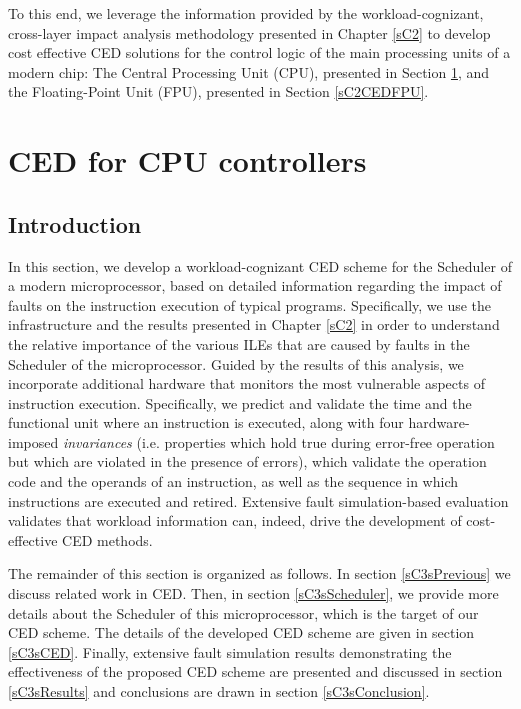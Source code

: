 \documentclass[12pt]{yalephd}
\begin{document}
To this end, we leverage the information provided by the workload-cognizant, cross-layer impact analysis methodology presented in Chapter \ref{sC2} to develop cost effective CED solutions for the control logic of the main processing units of a modern chip: The Central Processing Unit (CPU), presented in Section \ref{sC2CEDCPU}, and the Floating-Point Unit (FPU), presented in Section \ref{sC2CEDFPU}.

\section{CED for CPU controllers}\label{sC2CEDCPU}

\subsection{Introduction}

In this section, we develop a workload-cognizant CED scheme for the Scheduler of a modern microprocessor, based on detailed information regarding the impact of faults on the instruction execution of typical programs. Specifically, we use the infrastructure and the results presented in Chapter \ref{sC2} in order to understand the relative importance of the various ILEs that are caused by faults in the Scheduler of the microprocessor. Guided by the results of this analysis, we incorporate additional hardware that monitors the most vulnerable aspects of instruction execution. Specifically, we predict and validate the time and the functional unit where an instruction is executed, along with four hardware-imposed {\em invariances} (i.e. properties which hold true during error-free operation but which are violated in the presence of errors), which validate the operation code and the operands of an instruction, as well as the sequence in which instructions are executed and retired. Extensive fault simulation-based evaluation validates that workload information can, indeed, drive the development of cost-effective CED methods.

The remainder of this section is organized as follows. In section \ref{sC3sPrevious} we discuss related work in CED. Then, in section \ref{sC3sScheduler}, we provide more details about the Scheduler of this microprocessor, which is the target of our CED scheme. The details of the developed CED scheme are given in section \ref{sC3sCED}. Finally, extensive fault simulation results demonstrating the effectiveness of the proposed CED scheme are presented and discussed in section \ref{sC3sResults} and conclusions are drawn in section \ref{sC3sConclusion}.
\end{document}
